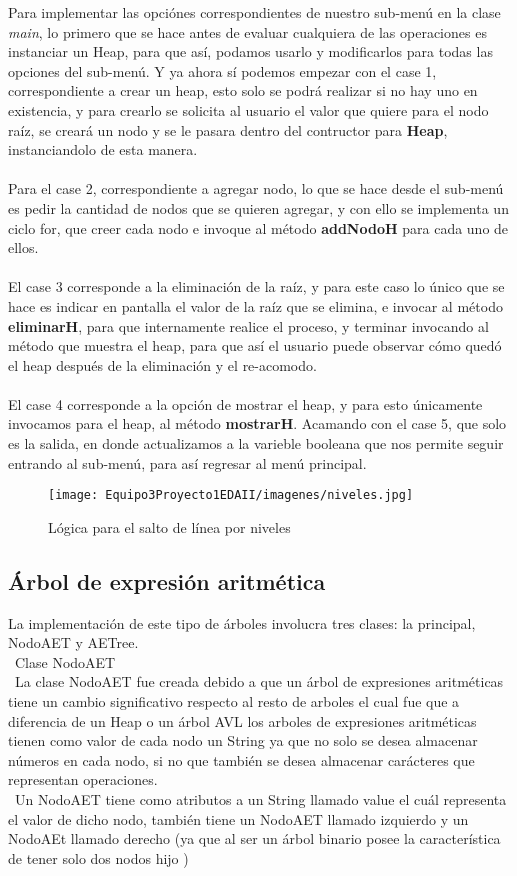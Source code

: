 \documentclass{report}
\begin{document}
Para implementar las opciónes correspondientes de nuestro sub-menú en la clase \textit{main}, lo primero que se hace antes de evaluar cualquiera de las operaciones es instanciar un Heap, para que así, podamos usarlo y modificarlos para todas las opciones del sub-menú. Y ya ahora sí podemos empezar con el case 1, correspondiente a crear un heap, esto solo se podrá realizar si no hay uno en existencia, y para crearlo se solicita al usuario el valor que quiere para el nodo raíz, se creará un nodo y se le pasara dentro del contructor para \textbf{Heap}, instanciandolo de esta manera.\\\\
Para el case 2, correspondiente a agregar nodo, lo que se hace desde el sub-menú es pedir la cantidad de nodos que se quieren agregar, y con ello se implementa un ciclo for, que creer cada nodo e invoque al método \textbf{addNodoH} para cada uno de ellos.\\\\
El case 3 corresponde a la eliminación de la raíz, y para este caso lo único que se hace es indicar en pantalla el valor de la raíz que se elimina, e invocar al método \textbf{eliminarH}, para que internamente realice el proceso, y terminar invocando al método que muestra el heap, para que así el usuario puede observar cómo quedó el heap después de la eliminación y el re-acomodo.\\\\
El case 4 corresponde a la opción de mostrar el heap, y para esto únicamente invocamos para el heap, al método \textbf{mostrarH}. Acamando con el case 5, que solo es la salida, en donde actualizamos a la varieble booleana que nos permite seguir entrando al sub-menú, para así regresar al menú principal.
\begin{figure}[h]
        \centering
        \texttt{[image: Equipo3Proyecto1EDAII/imagenes/niveles.jpg]}
        \caption{Lógica para el salto de línea por niveles}
        \label{fig:my_label}
\end{figure}

\subsection{Árbol de expresión aritmética}
La implementación de este tipo de árboles involucra tres clases: la principal, NodoAET y AETree.\\\
Clase NodoAET\\\
La clase NodoAET fue creada debido a que un árbol de expresiones aritméticas tiene un cambio significativo respecto al resto de arboles el cual fue que a diferencia de un Heap o un árbol AVL los arboles de expresiones aritméticas tienen como valor de cada nodo un String ya que no solo se desea almacenar números en cada nodo, si no que también se desea almacenar carácteres que representan operaciones.  \\\
Un NodoAET tiene como atributos a un String llamado value el cuál representa el valor de dicho nodo, también tiene un NodoAET llamado izquierdo y un NodoAEt llamado derecho (ya que al ser un árbol binario posee la característica de tener solo dos nodos hijo )\\\
\end{document}
